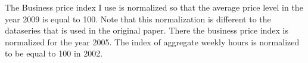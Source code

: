 The Business price index I use is normalized so that the average price level in
the year 2009 is equal to 100. Note that this normalization is different to the
dataseries that is used in the original paper. There the business price index
is normalized for the year 2005. The index of aggregate weekly hours is
normalized to be equal to 100 in 2002.
